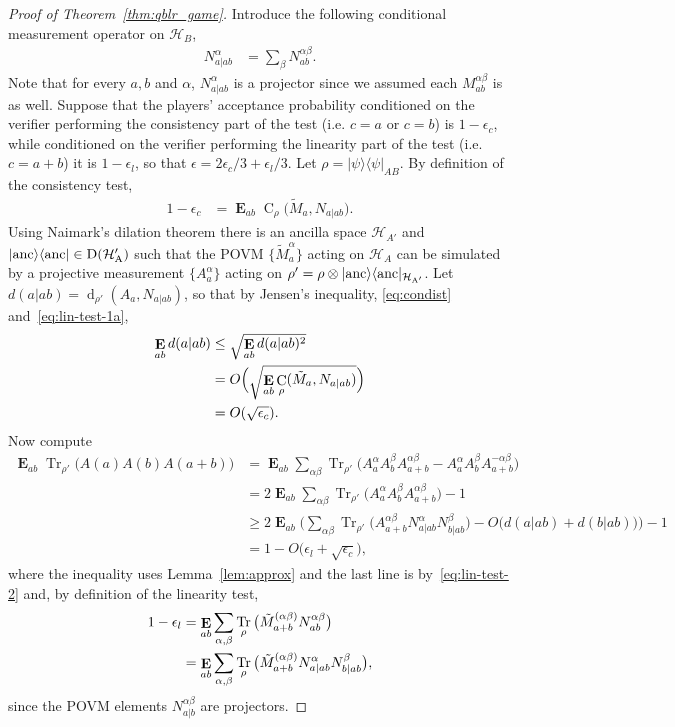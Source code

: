 \documentclass[11pt,letterpaper]{article}
\newcommand{\<}{\langle}
\renewcommand{\>}{\rangle}
\newcommand{\lemref}[1]{Lemma~\ref{lem:#1}}
\newcommand{\myeqref}[1]{\eqref{eq:#1}}
\newcommand{\setft}[1]{\mathrm{#1}}
\newcommand{\Density}{\setft{D}}
\renewcommand{\a}{\alpha}
\newcommand{\bra}[1]{\< #1 |}
\newcommand{\ket}[1]{| #1 \>}
\newcommand{\eps}{\epsilon}
\newcommand{\mH}{\mathcal{H}}
\DeclareMathOperator{\E}{\mathbf{E}}
\DeclareMathOperator{\Tr}{Tr}
\DeclareMathOperator{\CON}{C}
\DeclareMathOperator{\DIS}{d}
\DeclareMathOperator{\Trho}{\Tr_\rho}
\newcommand{\proj}[1]{\ket{#1}\bra{#1}}
\begin{document}
\begin{proof}[Proof of Theorem~\ref{thm:qblr_game}]
Introduce the following conditional measurement operator on $\mH_B$,
\begin{align*}
  N_{a|a b}^{\a} &= \sum_{\beta} N_{ab}^{\a \beta}.
\end{align*}
Note that for every $a,b$ and $\a$, $N_{a|ab}^\a$ is a projector since we assumed each $M_{ab}^{\a \beta}$ is as well. 
Suppose that the players' acceptance probability conditioned on the verifier performing the consistency part of the test (i.e. $c=a$ or $c=b$) is $1 -
\eps_{c}$, while conditioned on the verifier performing the linearity part of the test (i.e. $c=a+b$) it is $1 -
\eps_{l}$, so that $\eps = 2\eps_c/3 + \eps_l/3$. 
Let $\rho = \proj{\psi}_{AB}$. By definition of the consistency test,
\begin{align}
  1 - \eps_{c}  &=  \E_{ab} \CON_\rho\big(\tilde{M}_a, N_{a|ab}\big). \label{eq:lin-test-1a}
	\end{align}
Using Naimark's dilation theorem there is an ancilla space $\mH_{A'}$ and $\proj{\rm anc} \in \Density(\mH_A')$ such that the POVM $\{\tilde{M}^\a_a\}$ acting on $\mH_A$ can be simulated by a projective measurement $\{A_a^\a\}$ acting on ${\rho'} = {\rho} \otimes \proj{\rm anc}_{\mH_{A'}}$. 
Let
$d(a | ab ) = \DIS_{\rho'}\left( A_{a},N_{a|ab } \right)$, so that
by Jensen's inequality, \myeqref{condist} and~\eqref{eq:lin-test-1a},
\begin{align}
  \E_{ab} d(a|ab) &\leq \sqrt{\E_{ab} d(a | ab)^2}\notag\\
	&= O\Big(\sqrt{\E_{ab} \CON_{\rho}(\tilde{M}_a, N_{a|ab})}\Big)\notag \\
                        &= O(\sqrt{\eps_{c}}).\label{eq:lin-test-2}
\end{align}	
Now compute
	\begin{align*}
            \E_{ab} \Tr_{\rho'}\big(A(a) A(b) A(a + b)\big)   &= \E_{ab} \sum_{\a \beta} \Tr_{\rho'}\big(A_{a}^{\a} A_{b}^{\beta} A_{a+b}^{\a \beta} - A_{a}^{\a} A_{b}^{\beta} A_{a + b}^{- \a \beta}\big) \\
            &= 2\E_{ab} \sum_{\a \beta} \Tr_{\rho'}\big(A_{a}^{\a} A_{b}^{\beta} A^{\a \beta}_{a + b}\big) - 1 \\
            &\geq 2\E_{a b} \Big( \sum_{\a \beta}
              \Tr_{\rho'}\big( A^{\a \beta}_{a + b} N_{a|ab}^{\a} N_{b|ab}^{\beta}\big) - O\big( d(a|ab) +
              d(b|ab)\big)\Big)  - 1\\
            &= 1 - O\big(\eps_{l}+ \sqrt{\eps_{c}}\big),
\end{align*}
where the inequality uses \lemref{approx} and the last line is by~\eqref{eq:lin-test-2} and, by definition of the linearity test, 	
	\begin{align}
  1 - \eps_{l} &= \E_{ab} \sum_{\a, \beta} \Trho\big( \tilde{M}_{a + b}^{(\a \beta)} N_{ab}^{\a \beta} \big)\notag \\
  &=  \E_{ab} \sum_{\alpha, \beta} \Trho\big( \tilde{M}_{a+b}^{(\a \beta)} N_{a  |ab}^{\a} N_{b |ab}^{\beta} \big),\notag
\end{align}
since the POVM elements $N_{a|b}^{\a\beta}$ are projectors. 
\end{proof}
\end{document}
